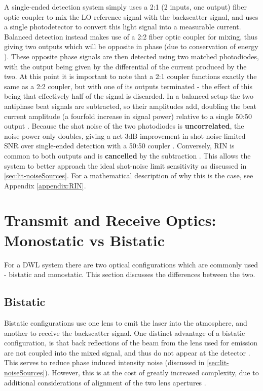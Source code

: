     A single-ended detection system simply uses a 2:1 (2 inputs, one output) fiber optic coupler to mix the LO reference signal with the backscatter signal, and uses a single photodetector to convert this light signal into a measurable current. Balanced detection instead makes use of a 2:2 fiber optic coupler for mixing, thus giving two outputs which will be opposite in phase (due to conservation of energy \cite{Schumaker1984}). These opposite phase signals are then detected using two matched photodiodes, with the output being given by the differential of the current produced by the two. At this point it is important to note that a 2:1 coupler functions exactly the same as a 2:2 coupler, but with one of its outputs terminated - the effect of this being that effectively half of the signal is discarded. In a balanced setup the two antiphase beat signals are subtracted, so their
    amplitudes add, doubling the beat current amplitude (a fourfold increase in signal power) relative to a single 50:50 output \cite{kikuchi_fundamentals_2016}. Because the
    shot noise of the two photodiodes is \textbf{uncorrelated}, the noise power only doubles,
    giving a net 3dB improvement in shot-noise-limited SNR over single-ended
    detection with a 50:50 coupler \cite{Schumaker1984}. Conversely, RIN is common to
    both outputs and is \textbf{cancelled} by the subtraction \cite{Abbas1983} \cite{abdelazim_development_2015}. This allows the system to better approach the ideal shot-noise limit sensitivity as discussed in \autoref{sec:lit-noiseSources}. For a mathematical description of why this is the case, see Appendix \ref{appendix:RIN}. 
    
    

\section{Transmit and Receive Optics: Monostatic vs Bistatic}
\label{sec:lit-optics}
    For a DWL system there are two optical configurations which are commonly used - bistatic and monostatic. This section discusses the differences between the two.

    \subsection{Bistatic}
    Bistatic configurations use one lens to emit the laser into the atmosphere, and another to receive the backscatter signal. One distinct advantage of a bistatic configuration, is that back reflections of the beam from the lens used for emission are not coupled into the mixed signal, and thus do not appear at the detector \cite{cariou2006laser}. This serves to reduce phase induced intensity noise (discussed in \autoref{sec:lit-noiseSources}). However, this is at the cost of greatly increased complexity, due to additional considerations of alignment of the two lens apertures \cite{harris_role_1998} \cite{bennett_doppler_2003}. 
    
